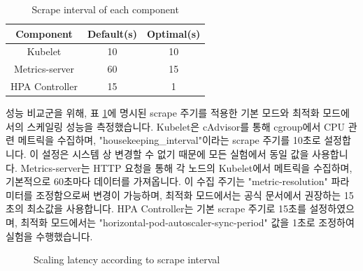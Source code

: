 \documentclass[conference]{IEEEtran}
\begin{document}
\begin{table}[tb]
    \caption{Scrape interval of each component}
    \begin{center}
        \begin{tabular}{|c|c|c|}
            \hline
            \cline{2-3}
            \textbf{Component} & \textbf{{Default(s)}} & {\textbf{Optimal(s)}} \\
            \hline
            Kubelet            & 10                    & 10                    \\
            \hline
            Metrics-server     & 60                    & 15                    \\
            \hline
            HPA Controller     & 15                    & 1                     \\
            \hline
        \end{tabular}
        \label{tab:scrape interval of each component}
    \end{center}
\end{table}

성능 비교군을 위해, 표 \ref{tab:scrape interval of each component}에 명시된 scrape 주기를 적용한 기본 모드와 최적화 모드에서의 스케일링 성능을 측정했습니다. Kubelet은 cAdvisor를 통해 cgroup에서 CPU 관련 메트릭을 수집하며, "housekeeping\_interval"이라는 scrape 주기를 10초로 설정합니다. 이 설정은 시스템 상 변경할 수 없기 때문에 모든 실험에서 동일 값을 사용합니다. Metrics-server는 HTTP 요청을 통해 각 노드의 Kubelet에서 메트릭을 수집하며, 기본적으로 60초마다 데이터를 가져옵니다. 이 수집 주기는 "metric-resolution" 파라미터를 조정함으로써 변경이 가능하며, 최적화 모드에서는 공식 문서에서 권장하는 15초의 최소값을 사용합니다\cite{metrics-server-FAQ}. HPA Controller는 기본 scrape 주기로 15초를 설정하였으며, 최적화 모드에서는 "horizontal-pod-autoscaler-sync-period" 값을 1초로 조정하여 실험을 수행했습니다.

\begin{figure}[tb]
    \caption{Scaling latency according to scrape interval}
    \label{fig:scaling time}
\end{figure}
\end{document}
